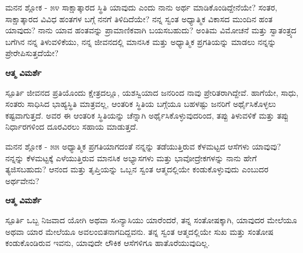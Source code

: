 \newpage
\begin{mananam}{\mananamfont ಮನನ ಶ್ಲೋಕ - ೫೪}
\footnotesize \mananamtext ಸಾಕ್ಷಾತ್ಕಾರದ ಸ್ಥಿತಿ ಯಾವುದು ಎಂದು ನಾನು ಅರ್ಥ ಮಾಡಿಕೊಂಡಿದ್ದೇನೆಯೇ? ಸಂತರ,  ಸಾಕ್ಷಾತ್ಕಾರದ  ವಿವಿಧ ಹಂತಗಳ ಬಗ್ಗೆ ನನಗೆ ತಿಳಿದಿದೆಯೇ? ನನ್ನ ಸ್ವಂತ ಅಧ್ಯಾತ್ಮಿಕ ವಿಕಾಸದ ಮುಂದಿನ ಹಂತ ಯಾವುದು? ನಾನು ಯಾವ ಹಂತವನ್ನು ಪ್ರಾಮಾಣಿಕವಾಗಿ ಬಯಸಬಹುದು? ಅಂತಿಮ ವಿಮೋಚನೆ ಮತ್ತು ಸ್ವಾತಂತ್ರ್ಯದ ಬಗೆಗಿನ ನನ್ನ ತಿಳುವಳಿಕೆಯು,  ನನ್ನ ಜೀವನದಲ್ಲಿ ಮಾನಸಿಕ ಮತ್ತು ಅಧ್ಯಾತ್ಮಿಕ ಪ್ರಗತಿಯನ್ನು ಮಾಡಲು  ನನ್ನನ್ನು ಪ್ರೇರೇಪಿಸುತ್ತದೆಯೇ?
\end{mananam}
\WritingHand\enspace\textbf{ಆತ್ಮ ವಿಮರ್ಶೆ}
\begin{inspiration}{\mananamfont ಸ್ಪೂರ್ತಿ}
\footnotesize \mananamtext ಜೀವನದ ಪ್ರತಿಯೊಂದು ಕ್ಷೇತ್ರದಲ್ಲೂ,  ಯಶಸ್ವಿಯಾದ ಜನರಿಂದ ನಾವು ಪ್ರೇರಿತರಾಗಿದ್ದೇವೆ. ಹಾಗೆಯೇ, ಸಾಧು, ಸಂತರು ಸಾಧಿಸಿದ ಭಾಹ್ಯಸ್ಥಿತಿ ಮಾತ್ರವಲ್ಲ, ಆಂತರಿಕ ಸ್ಥಿತಿಯ ಬಗ್ಗೆಯೂ ಬಹಳಷ್ಟು ಜನರಿಗೆ ಅರ್ಥೈಸಿಕೊಳ್ಳಲು ಕಷ್ಟವಾಗುತ್ತದೆ. ಅವರ ಈ ಆಂತರಿಕ ಸ್ಥಿತಿಯನ್ನು ಚೆನ್ನಾಗಿ ಅರ್ಥೈಸಿಕೊಳ್ಳುವುದರಿಂದ, ತಪ್ಪು ತಿಳುವಳಿಕೆ ಮತ್ತು ತಪ್ಪು ನಿರ್ಧಾರಗಳಿಂದ ದೂರವಿರಲು ಸಹಾಯ ಮಾಡುತ್ತದೆ.
\end{inspiration}
\newpage



\newpage
\begin{mananam}{\mananamfont ಮನನ ಶ್ಲೋಕ - ೫೫}
\footnotesize \mananamtext ಅಧ್ಯಾತ್ಮಿಕ ಪ್ರಗತಿಯಾಗದಂತೆ ನನ್ನನ್ನು ತಡೆಯುತ್ತಿರುವ ಕೆಳಮಟ್ಟದ ಆಸೆಗಳು ಯಾವುವು? ನನ್ನನ್ನು ಕೆಳಮಟ್ಟಕ್ಕೆ ಎಳೆಯುತ್ತಿರುವ ಮಾನಸಿಕ ಅಭ್ಯಾಸಗಳು ಮತ್ತು ಭಾವೋದ್ರೇಕಗಳನ್ನು   ನಾನು ಹೇಗೆ ತ್ಯಜಿಸಬಹುದು? ಆನಂದ ಮತ್ತು ತೃಪ್ತಿಯನ್ನು ಒಬ್ಬನ ಸ್ವಂತ ಆತ್ಮದಲ್ಲಿಯೇ ಕಂಡುಕೊಳ್ಳುವುದು ಎಂಬುದರ ಅರ್ಥವೇನು?
\end{mananam}
\WritingHand\enspace\textbf{ಆತ್ಮ ವಿಮರ್ಶೆ}
\begin{inspiration}{\mananamfont ಸ್ಪೂರ್ತಿ}
\footnotesize \mananamtext  ಒಬ್ಬ ನಿಜವಾದ ಯೋಗಿ ಅಥವಾ ಸoನ್ಯಾಸಿಯು ಯಾರೆಂದರೆ, ತನ್ನ ಸಂತೋಷಕ್ಕಾಗಿ, ಯಾವುದರ ಮೇಲೆಯೂ ಅಥವಾ ಯಾರ ಮೇಲೆಯೂ ಅವಲಂಬಿತನಾಗದಿದ್ದವನು. ತನ್ನ ಸ್ವಂತ ಆತ್ಮದಲ್ಲಿಯೇ ಸುಖ ಮತ್ತು ಸಂತೋಷ ಕಂಡುಕೊಂಡಿರುವ ಇವನು, ಯಾವುದೇ ಲೌಕಿಕ ಆಸೆಗಳಿಗೂ ಹಾತೊರೆಯುವುದಿಲ್ಲ.
\end{inspiration}
\newpage

